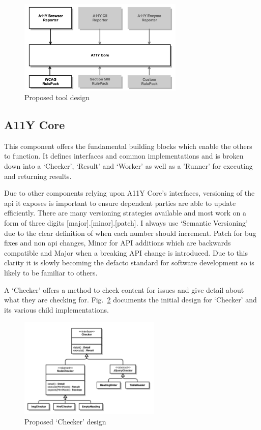 \begin{figure}[H]
\centering
\includegraphics[width=0.7\textwidth]{figures/a11y_tool_proposed_design}
\captionsetup{justification=centering}
\caption{Proposed tool design
\label{fig:tool_proposed_design}}
\end{figure}

\subsection{A11Y Core}
This component offers the fundamental building blocks which enable the
others to function. It defines interfaces and common implementations and
is broken down into a `Checker', `Result' and `Worker' as well as a 'Runner'
for executing and returning results.

Due to other components relying upon A11Y Core's interfaces, versioning of
the api it exposes is important to ensure dependent parties are able to update
efficiently. There are many versioning strategies available and most work on
a form of three digits [major].[minor].[patch]. I always use `Semantic
Versioning' due to the clear definition of when each number should increment.
Patch for bug fixes and non api changes, Minor for API additions which are
backwards compatible and Major when a breaking API change is introduced. Due to this
clarity it is slowly becoming the defacto standard for software development
so is likely to be familiar to others.

A `Checker' offers a method to check content for issues and give detail
about what they are checking for. Fig.~\ref{fig:checker_design} documents the
initial design for `Checker' and its various child implementations.

\begin{figure}[H]
\centering
\includegraphics[width=0.6\textwidth]{figures/a11y_tool_checkers}
\captionsetup{justification=centering}
\caption{Proposed `Checker' design
\label{fig:checker_design}}
\end{figure}

